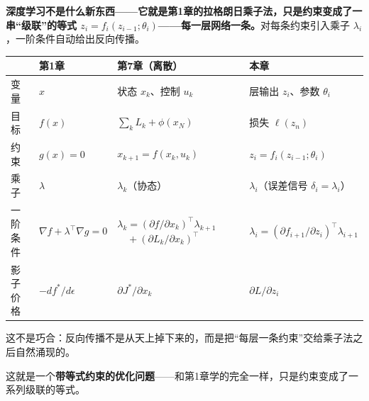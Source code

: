 \begin{tcolorbox}[colback=yellow!10, colframe=orange!80, title=本章的核心观点]
\textbf{深度学习不是什么新东西——它就是第1章的拉格朗日乘子法，只是约束变成了一串“级联”的等式 $z_i = f_i(z_{i-1}; \theta_i)$——每一层网络一条。}对每条约束引入乘子 $\lambda_i$，一阶条件自动给出反向传播。

\begin{center}
\renewcommand{\arraystretch}{1.3}
\small
\begin{tabularx}{\linewidth}{@{}l>{\raggedright\arraybackslash}p{2.5cm}>{\raggedright\arraybackslash}X>{\raggedright\arraybackslash}X@{}}
\toprule
 & \textbf{第1章} & \textbf{第7章（离散）} & \textbf{本章} \\
\midrule
变量 & $x$ & 状态 $x_k$、控制 $u_k$ & 层输出 $z_i$、参数 $\theta_i$ \\
目标 & $f(x)$ & $\sum_k L_k + \phi(x_N)$ & 损失 $\ell(z_n)$ \\
约束 & $g(x) = 0$ & $x_{k+1} = f(x_k, u_k)$ & $z_i = f_i(z_{i-1}; \theta_i)$ \\
乘子 & $\lambda$ & $\lambda_k$（协态） & $\lambda_i$（误差信号 $\delta_i = \lambda_i$） \\
一阶条件 & $\nabla f + \lambda^\top \nabla g = 0$ & $\lambda_k = (\partial f/\partial x_k)^\top \lambda_{k+1}$\newline$\quad{} + (\partial L_k/\partial x_k)^\top$ & $\lambda_i = (\partial f_{i+1}/\partial z_i)^\top \lambda_{i+1}$ \\
影子价格 & $-df^*/d\epsilon$ & $\partial J^*/\partial x_k$ & $\partial L/\partial z_i$ \\
\bottomrule
\end{tabularx}
\end{center}
这不是巧合：反向传播不是从天上掉下来的，而是把“每层一条约束”交给乘子法之后自然涌现的。
\end{tcolorbox}

这就是一个\textbf{带等式约束的优化问题}——和第1章学的完全一样，只是约束变成了一系列级联的等式。

